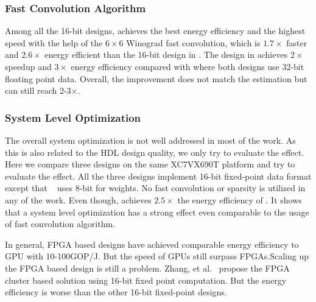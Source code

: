 \subsubsection{Fast Convolution Algorithm} Among all the 16-bit designs, \cite{lu2017evaluating} achieves the best energy efficiency and the highest speed with the help of the $6\times 6$ Winograd fast convolution, which is $1.7\times$ faster and $2.6\times$ energy efficient than the 16-bit design in \cite{zhang2017improving}. The design in \cite{zhang2017frequency} achieves $2\times$ speedup and $3\times$ energy efficiency compared with \cite{zhang2015optimizing} where both designs use 32-bit floating point data. Overall, the improvement does not match the estimation but can still reach 2-3$\times$.

\subsubsection{System Level Optimization} The overall system optimization is not well addressed in most of the work. As this is also related to the HDL design quality, we only try to evaluate the effect. Here we compare three designs\cite{zhang2016caffeine, liu2016automatic, li2016high} on the same XC7VX690T platform and try to evaluate the effect. All the three designs implement 16-bit fixed-point data format except that ~\cite{liu2016automatic} uses 8-bit for weights. No fast convolution or sparsity is utilized in any of the work. Even though, \cite{li2016high} achieves $2.5\times$ the energy efficiency of \cite{liu2016automatic}. It shows that a system level optimization has a strong effect even comparable to the usage of fast convolution algorithm. 

In general, FPGA based designs have achieved comparable energy efficiency to GPU with 10-100GOP/J. But the speed of GPUs still surpass FPGAs.Scaling up the FPGA based design is still a problem. Zhang, et al.~\cite{zhang2016energy} propose the FPGA cluster based solution using 16-bit fixed point computation. But the energy efficiency is worse than the other 16-bit fixed-point designs. 

